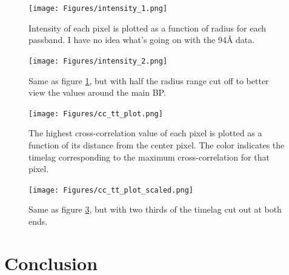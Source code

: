 \documentclass[preprint2]{aastex}
\begin{document}
\begin{figure}[htb!]
    \texttt{[image: Figures/intensity\_1.png]}
    \caption{Intensity of each pixel is plotted as a function of radius for each
        passband. I have no idea what's going on with the 94\AA{} data.}
    \label{intensity_1}
\end{figure}

\begin{figure}[htb!]
    \texttt{[image: Figures/intensity\_2.png]}
    \caption{Same as figure \ref{intensity_1}, but with half the radius range
        cut off to better view the values around the main BP.}
    \label{intensity_2}
\end{figure}

\begin{figure}[htb!]
    \texttt{[image: Figures/cc\_tt\_plot.png]}
    \caption{The highest cross-correlation value of each pixel is plotted as a function
        of its distance from the center pixel. The color indicates the timelag
        corresponding to the maximum cross-correlation for that pixel.}
    \label{tt_all_plot}
\end{figure}

\begin{figure}[htb!]
    \texttt{[image: Figures/cc\_tt\_plot\_scaled.png]}
    \caption{Same as figure \ref{tt_all_plot}, but with two thirds of the timelag cut out
        at both ends.}
    \label{tt_plot}
\end{figure}


\section{Conclusion}\label{conclusion}


\end{document}
